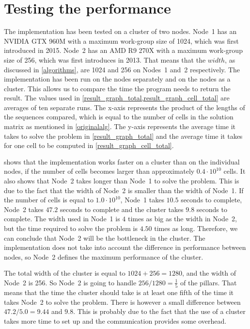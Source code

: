 \section{Testing the performance} \label{testing}
The implementation has been tested on a cluster of two nodes.
Node~1 has an NVIDIA GTX 960M with a maximum work-group size of 1024, which was first introduced in 2015.
Node~2 has an AMD R9 270X with a maximum work-group size of 256, which was first introduces in 2013.
That means that the $width$, as discussed in \cref{algorithms}, are 1024 and 256 on Nodes~1 and~2 respectively.
The implementation has been run on the nodes separately and on the nodes as a cluster.
This allows us to compare the time the program needs to return the result.
The values used in \cref{result_graph_total,result_graph_cell_total} are averages of ten separate runs.
The x-axis represents the product of the lengths of the sequences compared, which is equal to the number of cells in the solution matrix as mentioned in \cref{originalalg}.
The y-axis represents the average time it takes to solve the problem in \cref{result_graph_total} and the average time it takes for one cell to be computed in \cref{result_graph_cell_total}.

 shows that the implementation works faster on a cluster than on the individual nodes, if the number of cells becomes larger than approximately $0.4 \cdot 10^{10}$ cells.
It also shows that Node~2 takes longer than Node~1 to solve the problem.
This is due to the fact that the width of Node~2 is smaller than the width of Node~1.
If the number of cells is equal to $1.0 \cdot 10^{10}$, Node~1 takes $10.5$ seconds to complete, Node~2 takes $47.2$ seconds to complete and the cluster takes $9.8$ seconds to complete.
The width used in Node~1 is $4$ times as big as the width in Node~2, but the time required to solve the problem is $4.50$ times as long.
Therefore, we can conclude that Node~2 will be the bottleneck in the cluster.
The implementation does not take into account the difference in performance between nodes, so Node~2 defines the maximum performance of the cluster.

The total width of the cluster is equal to $1024 + 256 = 1280$, and the width of Node~2 is 256.
So Node~2 is going to handle $256 / 1280 = \frac{1}{5}$ of the pillars.
That means that the time the cluster should take is at least one fifth of the time it takes Node~2 to solve the problem.
There is however a small difference between $47.2 / 5.0 = 9.44$ and $9.8$.
This is probably due to the fact that the use of a cluster takes more time to set up and the communication provides some overhead.

